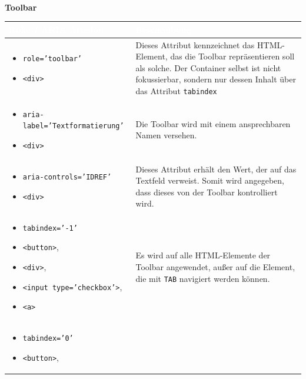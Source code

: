 \newpage
\mbox{}\\
\textbf{Toolbar}
~\begin{longtable}{| p{} | p{} |} 
	\hline
	\cellcolor{Gray}\textcolor{White}{Rolle / ARIA Attribut} & \cellcolor{Gray}\textcolor{White}{Beschreibung}  \\
	\hline
	\begin{itemize}[label={}, leftmargin=*]
		\item \texttt{role='toolbar'}
		\item \texttt{<div>}
	\end{itemize} 
	& Dieses Attribut kennzeichnet das HTML-Element, das die Toolbar 
		repräsentieren soll als solche.  Der Container selbst ist nicht fokussierbar, sondern nur dessen Inhalt 
		über das Attribut \texttt{tabindex}\\
	\hline
	\begin{itemize}[label={}, leftmargin=*]
		\item \texttt{aria-label='Textformatierung'}
		\item \texttt{<div>}
	\end{itemize} 
	& Die Toolbar wird mit einem ansprechbaren Namen versehen. \\
	\hline
	\begin{itemize}[label={}, leftmargin=*]
		\item \texttt{aria-controls='IDREF'}
		\item \texttt{<div>}
	\end{itemize} 
	 & Dieses Attribut erhält den Wert, der auf das Textfeld verweist. Somit wird angegeben, dass dieses von der 
	 Toolbar kontrolliert wird. \\
	\hline
	\begin{itemize}[label={}, leftmargin=*]
		\item \texttt{tabindex='-1'}
		\item \texttt{<button>},
		\item \texttt{<div>},
		\item \texttt{<input type='checkbox'>},
		\item \texttt{<a>}
	\end{itemize} 
	& Es wird auf alle HTML-Elemente der Toolbar angewendet, außer auf die Element, die mit \texttt{TAB} navigiert 
	werden können. \\
	\hline
	\begin{itemize}[label={}, leftmargin=*]
		\item \texttt{tabindex='0'}
		\item \texttt{<button>},

\end{itemize}
\end{longtable}

